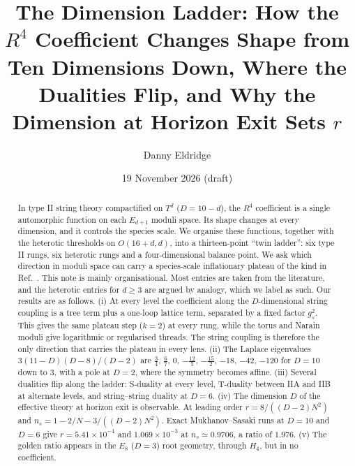 \documentclass[aps,prd,twocolumn,superscriptaddress,nofootinbib,showkeys]{revtex4-2}
\begin{document}
\title{The Dimension Ladder: How the $R^4$ Coefficient Changes Shape from Ten Dimensions Down, Where the Dualities Flip, and Why the Dimension at Horizon Exit Sets $r$}
\author{Danny Eldridge}
\date{19 November 2026 (draft)}
\begin{abstract}
In type II string theory compactified on $T^d$ ($D=10-d$), the $R^4$ coefficient is a single automorphic function on each $E_{d+1}$ moduli space. Its shape changes at every dimension, and it controls the species scale. We organise these functions, together with the heterotic thresholds on $O(16+d,d)$, into a thirteen-point ``twin ladder'': six type II rungs, six heterotic rungs and a four-dimensional balance point. We ask which direction in moduli space can carry a species-scale inflationary plateau of the kind in Ref.~\cite{P1}. This note is mainly organisational. Most entries are taken from the literature, and the heterotic entries for $d\ge3$ are argued by analogy, which we label as such. Our results are as follows.
(i) At every level the coefficient along the $D$-dimensional string coupling is a tree term plus a one-loop lattice term, separated by a fixed factor $g_s^2$. This gives the same plateau step ($k=2$) at every rung, while the torus and Narain moduli give logarithmic or regularised threads. The string coupling is therefore the only direction that carries the plateau in every lens.
(ii) The Laplace eigenvalues $3(11-D)(D-8)/(D-2)$ are $\tfrac34$, $\tfrac67$, $0$, $-\tfrac{12}{5}$, $-\tfrac{15}{2}$, $-18$, $-42$, $-120$ for $D=10$ down to $3$, with a pole at $D=2$, where the symmetry becomes affine.
(iii) Several dualities flip along the ladder: S-duality at every level, T-duality between IIA and IIB at alternate levels, and string--string duality at $D=6$.
(iv) The dimension $D$ of the effective theory at horizon exit is observable. At leading order $r=8/((D-2)N^2)$ and $n_s=1-2/N-3/((D-2)N^2)$. Exact Mukhanov--Sasaki runs at $D=10$ and $D=6$ give $r=5.41\times10^{-4}$ and $1.069\times10^{-3}$ at $n_s\simeq0.9706$, a ratio of $1.976$.
(v) The golden ratio appears in the $E_8$ ($D=3$) root geometry, through $H_4$, but in no coefficient.
\end{abstract}
\maketitle
\end{document}
